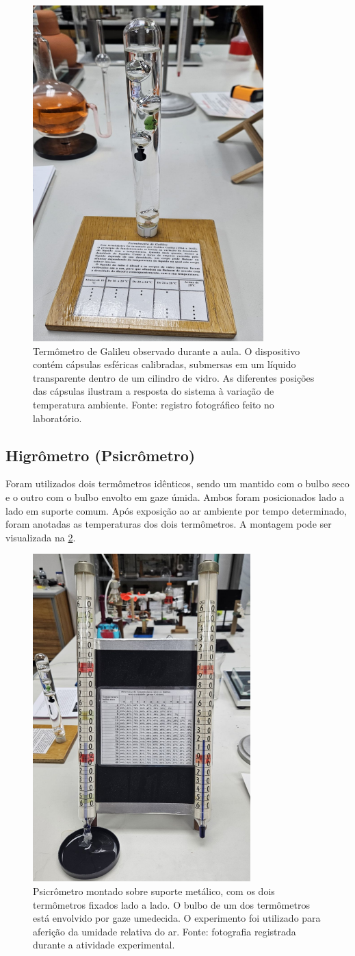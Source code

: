 \begin{figure}[H]
    \centering
    \includegraphics[width=0.25\linewidth]{fig/termometro.png}
    \caption{Termômetro de Galileu observado durante a aula. O dispositivo contém cápsulas esféricas calibradas, submersas em um líquido transparente dentro de um cilindro de vidro. As diferentes posições das cápsulas ilustram a resposta do sistema à variação de temperatura ambiente. Fonte: registro fotográfico feito no laboratório.}
    \label{fig:termometro}
\end{figure}

\subsection{Higrômetro (Psicrômetro)}
Foram utilizados dois termômetros idênticos, sendo um mantido com o bulbo seco e o outro com o bulbo envolto em gaze úmida. Ambos foram posicionados lado a lado em suporte comum. Após exposição ao ar ambiente por tempo determinado, foram anotadas as temperaturas dos dois termômetros. A montagem pode ser visualizada na \cref{fig:psicrometro}.

\begin{figure}[H]
    \centering
    \includegraphics[width=0.30\linewidth]{fig/psicrometro.png}
    \caption{Psicrômetro montado sobre suporte metálico, com os dois termômetros fixados lado a lado. O bulbo de um dos termômetros está envolvido por gaze umedecida. O experimento foi utilizado para aferição da umidade relativa do ar. Fonte: fotografia registrada durante a atividade experimental.}
    \label{fig:psicrometro}
\end{figure}

